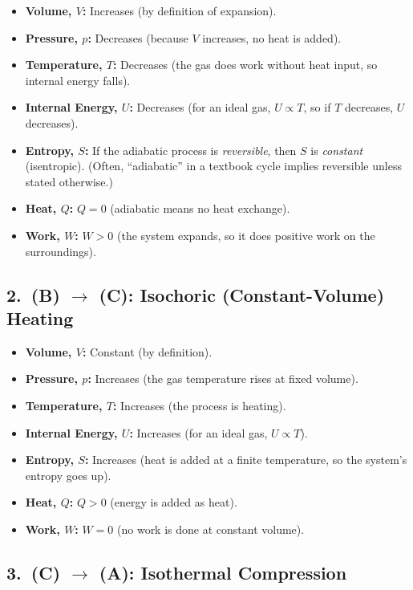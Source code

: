 \documentclass[12pt]{article}
\theoremstyle{definition} %
\theoremstyle{plain} %
\begin{document}
\begin{itemize}
  \item \textbf{Volume, $V$:} Increases (by definition of expansion).
  \item \textbf{Pressure, $p$:} Decreases (because $V$ increases, no heat is added).
  \item \textbf{Temperature, $T$:} Decreases (the gas does work without heat input, so internal energy falls).
  \item \textbf{Internal Energy, $U$:} Decreases (for an ideal gas, $U \propto T$, so if $T$ decreases, $U$ decreases).
  \item \textbf{Entropy, $S$:} 
    If the adiabatic process is \emph{reversible}, then $S$ is \emph{constant} (isentropic). 
    (Often, ``adiabatic'' in a textbook cycle implies reversible unless stated otherwise.)
  \item \textbf{Heat, $Q$:} $Q = 0$ (adiabatic means no heat exchange).
  \item \textbf{Work, $W$:} $W>0$ (the system expands, so it does positive work on the surroundings).
\end{itemize}

\subsection*{2.\ (B) $\to$ (C): Isochoric (Constant-Volume) Heating}

\begin{itemize}
  \item \textbf{Volume, $V$:} Constant (by definition).
  \item \textbf{Pressure, $p$:} Increases (the gas temperature rises at fixed volume).
  \item \textbf{Temperature, $T$:} Increases (the process is heating).
  \item \textbf{Internal Energy, $U$:} Increases (for an ideal gas, $U \propto T$).
  \item \textbf{Entropy, $S$:} Increases (heat is added at a finite temperature, so the system's entropy goes up).
  \item \textbf{Heat, $Q$:} $Q>0$ (energy is added as heat).
  \item \textbf{Work, $W$:} $W=0$ (no work is done at constant volume).
\end{itemize}

\subsection*{3.\ (C) $\to$ (A): Isothermal Compression}
\end{document}
